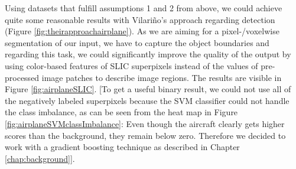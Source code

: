 Using datasets that fulfill assumptions 1 and 2 from above, we could achieve quite some reasonable results with Vilari\~no's approach regarding detection (Figure \ref{fig:theirapproachairplane}). As we are aiming for a pixel-/voxelwise segmentation of our input, we have to capture the object boundaries and regarding this task, we could significantly improve the quality of the output by using color-based features  of SLIC superpixels instead of the values of pre-processed image patches to describe image regions. The results are visible in Figure \ref{fig:airplaneSLIC}. [To get a useful binary result, we could not use all of the negatively labeled superpixels because the SVM classifier could not handle the class imbalance, as can be seen from the heat map in Figure \ref{fig:airplaneSVMclassImbalance}: Even though the aircraft clearly gets higher scores than the background, they remain below zero. Therefore we decided to work with a gradient boosting technique as described in Chapter \ref{chap:background}].

